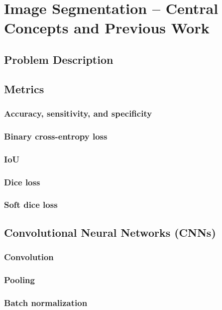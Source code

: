 \section{Image Segmentation -- Central Concepts and Previous Work}


\subsection{Problem Description}
\label{sec:segmentation-description}


\subsection{Metrics}
\label{sec:segmentation-metrics}
  \subsubsection{Accuracy, sensitivity, and specificity}
  \subsubsection{Binary cross-entropy loss}
  \subsubsection{IoU}
  \subsubsection{Dice loss}
  \subsubsection{Soft dice loss}

\subsection{Convolutional Neural Networks (CNNs)}
\label{sec:cnn}
  \subsubsection{Convolution}
  \subsubsection{Pooling}
  \subsubsection{Batch normalization}

